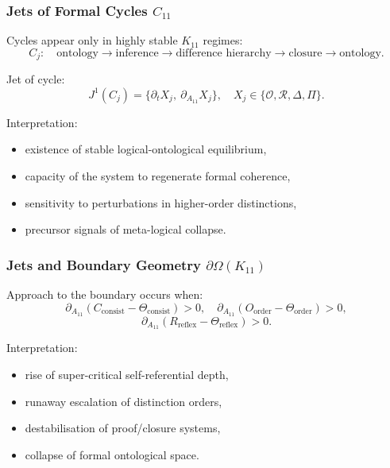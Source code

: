 \subsubsection{Jets of Formal Cycles $C_{11}$}

Cycles appear only in highly stable $K_{11}$ regimes:
\[
C_j:\quad
\text{ontology}
\to\text{inference}
\to\text{difference hierarchy}
\to\text{closure}
\to\text{ontology}.
\]

Jet of cycle:
\[
J^1(C_j)
=
\{\partial_t X_j,\ \partial_{A_{11}}X_j\},
\quad X_j\in
\{\mathcal{O},\mathcal{R},\Delta,\Pi\}.
\]

Interpretation:
\begin{itemize}
    \item existence of stable logical-ontological equilibrium,
    \item capacity of the system to regenerate formal coherence,
    \item sensitivity to perturbations in higher-order distinctions,
    \item precursor signals of meta-logical collapse.
\end{itemize}


\subsubsection{Jets and Boundary Geometry $\partial\Omega(K_{11})$}

Approach to the boundary occurs when:
\[
\partial_{A_{11}}
(C_{\mathrm{consist}}-\Theta_{\mathrm{consist}})>0,
\quad
\partial_{A_{11}}
(O_{\mathrm{order}}-\Theta_{\mathrm{order}})>0,
\]
\[
\partial_{A_{11}}
(R_{\mathrm{reflex}}-\Theta_{\mathrm{reflex}})>0.
\]

Interpretation:
\begin{itemize}
    \item rise of super-critical self-referential depth,
    \item runaway escalation of distinction orders,
    \item destabilisation of proof/closure systems,
    \item collapse of formal ontological space.
\end{itemize}


